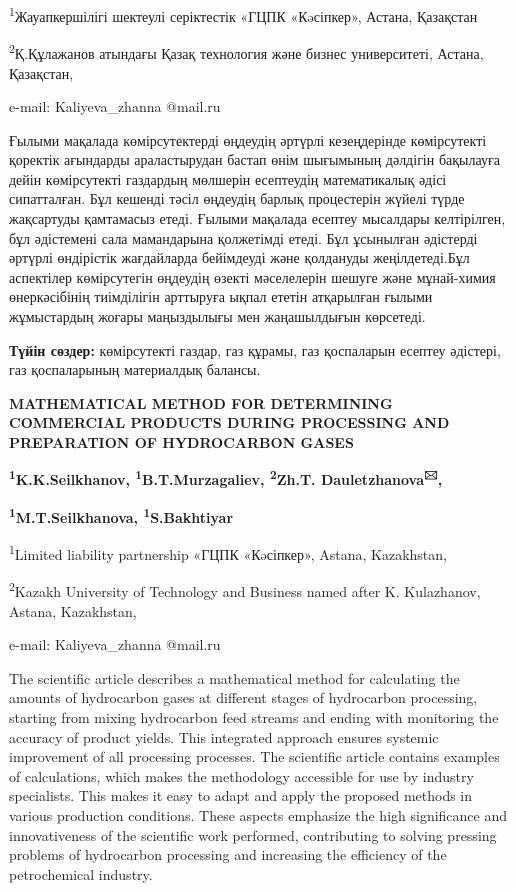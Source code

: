 \textsuperscript{1}Жауапкершілігі шектеулі серіктестік «ГЦПК «Кəсіпкер»,
Астана, Қазақстан

\textsuperscript{2}Қ.Құлажанов атындағы Қазақ технология және бизнес
университеті, Астана, Қазақстан,

e-mail: Kaliyeva\_zhanna @mail.ru

Ғылыми мақалада көмірсутектерді өңдеудің әртүрлі кезеңдерінде
көмірсутекті қоректік ағындарды араластырудан бастап өнім шығымының
дәлдігін бақылауға дейін көмірсутекті газдардың мөлшерін есептеудің
математикалық әдісі сипатталған. Бұл кешенді тәсіл өңдеудің барлық
процестерін жүйелі түрде жақсартуды қамтамасыз етеді. Ғылыми мақалада
есептеу мысалдары келтірілген, бұл әдістемені сала мамандарына
қолжетімді етеді. Бұл ұсынылған әдістерді әртүрлі өндірістік жағдайларда
бейімдеуді және қолдануды жеңілдетеді.Бұл аспектілер көмірсутегін
өңдеудің өзекті мәселелерін шешуге және мұнай-химия өнеркәсібінің
тиімділігін арттыруға ықпал ететін атқарылған ғылыми жұмыстардың жоғары
маңыздылығы мен жаңашылдығын көрсетеді.

{\bfseries Түйін сөздер:} көмірсутекті газдар, газ құрамы, газ қоспаларын
есептеу әдістері, газ қоспаларының материалдық балансы.

{\bfseries MATHEMATICAL METHOD FOR DETERMINING COMMERCIAL PRODUCTS DURING
PROCESSING AND PREPARATION OF HYDROCARBON GASES}

{\bfseries \textsuperscript{1}K.K.Seilkhanov,
\textsuperscript{1}B.T.Murzagaliev, \textsuperscript{2}Zh.T.
Dauletzhanova\textsuperscript{🖂},}

{\bfseries \textsuperscript{1}M.T.Seilkhanova,
\textsuperscript{1}S.Bakhtiyar}

\textsuperscript{1}Limited liability partnership «ГЦПК «Кəсіпкер»,
Astana, Kazakhstan,

\textsuperscript{2}Kazakh University of Technology and Business named
after K. Kulazhanov, Astana, Kazakhstan,

e-mail: Kaliyeva\_zhanna @mail.ru

The scientific article describes a mathematical method for calculating
the amounts of hydrocarbon gases at different stages of hydrocarbon
processing, starting from mixing hydrocarbon feed streams and ending
with monitoring the accuracy of product yields. This integrated approach
ensures systemic improvement of all processing processes. The scientific
article contains examples of calculations, which makes the methodology
accessible for use by industry specialists. This makes it easy to adapt
and apply the proposed methods in various production conditions. These
aspects emphasize the high significance and innovativeness of the
scientific work performed, contributing to solving pressing problems of
hydrocarbon processing and increasing the efficiency of the
petrochemical industry.

